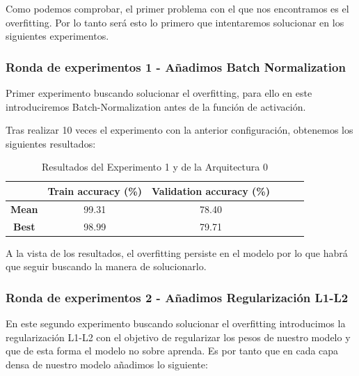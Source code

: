 \documentclass{article}
\begin{document}
		    Como podemos comprobar, el primer problema con el que nos encontramos es el overfitting. Por lo tanto ser\'a esto lo primero que intentaremos solucionar en los siguientes experimentos.

      \subsubsection{Ronda de experimentos 1 - A\~{n}adimos Batch Normalization}
		\label{j-s-a0-e1} %
			Primer experimento buscando solucionar el overfitting, para ello en este introduciremos Batch-Normalization antes de la funci\'on de activaci\'on.
			
			
			Tras realizar 10 veces el experimento con la anterior configuraci\'on, obtenemos los siguientes resultados:
			\begin{table}[!h]
				\begin{center}
					\begin{tabular}{ c | c | c | c | c | c |}
						\ & \textbf{Train accuracy (\%)} & \textbf{Validation accuracy (\%)}  \\ \hline
						\textbf{Mean} & 99.31 & 78.40 \\ \hline
						\textbf{Best} & 98.99 & 79.71 \\ \hline
					\end{tabular}
					\caption{Resultados del Experimento 1 y de la Arquitectura 0}
					\label{tab:res-j-a0-e1}
				\end{center}
			\end{table}
		    
		    A la vista de los resultados, el overfitting persiste en el modelo por lo que habr\'a que seguir buscando la manera de solucionarlo.

      \subsubsection{Ronda de experimentos 2 - A\~{n}adimos Regularizaci\'on L1-L2}
		\label{j-s-a0-e2} %
			En este segundo experimento buscando solucionar el overfitting introducimos la regularizaci\'on L1-L2 con el objetivo de regularizar los pesos de nuestro modelo y que de esta forma el modelo no sobre aprenda.
            Es por tanto que en cada capa densa de nuestro modelo a\~{n}adimos lo siguiente:
            
\end{document}

